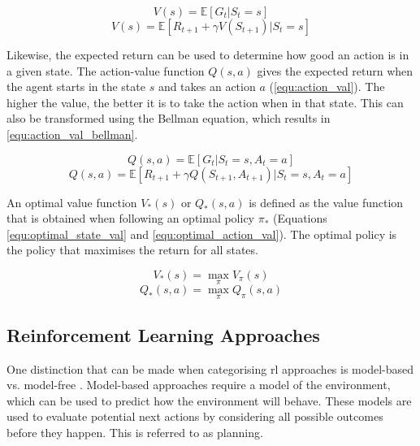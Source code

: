 \begin{equation}
\label{equ:state_val}
V(s)= \mathbb{E}[G_t | S_t=s]
\end{equation}
\begin{equation}
\label{equ:state_val_bellman}
V(s)= \mathbb{E}[R_{t+1}+\gamma V(S_{t+1})| S_t=s]
\end{equation}

Likewise, the expected return can be used to determine how good an action is in a given state. The action-value function $Q(s, a)$ gives the expected return when the agent starts in the state $s$ and takes an action $a$ (\autoref{equ:action_val}). The higher the value, the better it is to take the action when in that state. This can also be transformed using the Bellman equation, which results in \autoref{equ:action_val_bellman}.

\begin{equation}
\label{equ:action_val}
Q(s, a)= \mathbb{E}[G_t | S_t=s, A_t=a]
\end{equation}
\begin{equation}
\label{equ:action_val_bellman}
Q(s, a)= \mathbb{E}[R_{t+1}+\gamma Q(S_{t+1}, A_{t+1}) | S_t=s, A_t=a]
\end{equation}

An optimal value function $V_*(s)$ or $Q_*(s, a)$ is defined as the value function that is obtained when following an optimal policy $\pi_*$ (Equations \ref{equ:optimal_state_val} and \ref{equ:optimal_action_val}). The optimal policy is the policy that maximises the return for all states.

\begin{equation}
\label{equ:optimal_state_val}
V_*(s)=\max_{\pi} V_\pi(s)
\end{equation}
\begin{equation}
\label{equ:optimal_action_val}
Q_*(s, a)=\max_{\pi} Q_\pi(s, a)
\end{equation}

\subsection{Reinforcement Learning Approaches}

One distinction that can be made when categorising \gls{rl} approaches is model-based vs. model-free \parencite{SuttonBarto_2018}. Model-based approaches require a model of the environment, which can be used to predict how the environment will behave. These models are used to evaluate potential next actions by considering all possible outcomes before they happen. This is referred to as planning.

